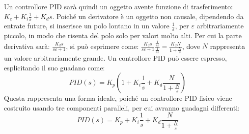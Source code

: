 \documentclass{article}
\numberwithin{equation}{subsection}
\begin{document}
\begin{center}\end{center}


Un controllore PID sarà quindi un 
oggetto avente funzione di trasferimento: $K_c+K_i\displaystyle\frac{1}{s}+K_ds$. Poiché un derivatore è un oggetto non causale, dipendendo da entrate future, si 
inserisce un polo lontano in un valore 
$\displaystyle\frac{1}{\varepsilon}$, per $\varepsilon$ arbitrariamente piccolo, in modo che risenta del polo solo per valori molto alti. Per cui la parte derivativa sarà: 
$\displaystyle\frac{K_ds}{s\varepsilon+1}$, si può esprimere come: 
$\displaystyle\frac{K_ds}{s\varepsilon+1}\frac{\displaystyle\frac{1}{s\varepsilon}}{\displaystyle\frac{1}{s\varepsilon}}=\frac{K_dN}{1+\displaystyle\frac{N}{s}}$, dove 
$N$ rappresenta un valore arbitrariamente grande. 
Un controllore PID può essere espresso, esplicitando il suo guadano come: 
\begin{equation}
    PID(s)=K_p\left(1+K_i\displaystyle\frac{1}{s}+K_d\frac{N}{1+\displaystyle\frac{N}{s}}\right)
\end{equation}
Questa rappresenta una forma ideale, poiché un controllore PID fisico viene costruito usando tre componenti paralleli, per cui avranno guadagni differenti:
\begin{equation}
    PID(s)=K_p+K_i\displaystyle\frac{1}{s}+K_d\frac{N}{1+\displaystyle\frac{N}{s}}
\end{equation}
\end{document}
